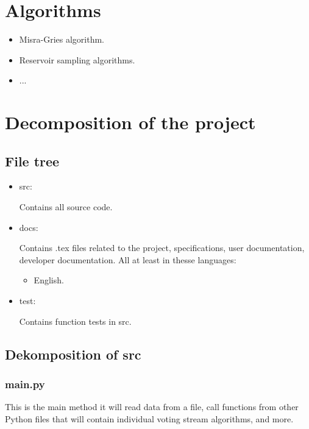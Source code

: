 \documentclass[a4paper,12pt]{report}
\begin{document}
	\section{Algorithms}
	
	\begin{itemize}
		\item Misra-Gries algorithm.
		\item Reservoir sampling algorithms.
		\item ...
	\end{itemize}
	
	\section{Decomposition of the project}
	
	\subsection{File tree}
	
	\begin{itemize}
		\item src:
		
		Contains all source code.
		
		\item docs:
		
		Contains .tex files related to the project, specifications, user documentation, developer documentation. All at least in thesse languages:
		
		\begin{itemize}
			\item English.
		\end{itemize}
		
		\item test:
		
		Contains function tests in src.
	\end{itemize}
	
	\subsection{Dekomposition of src}
	
	\subsubsection{main.py}
	
	This is the main method it will read data from a file, call functions from other Python files that will contain individual voting stream algorithms, and more.
	
\end{document}
